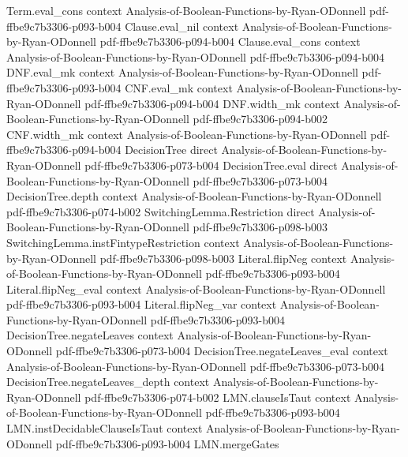 \begin{lemma}
\proofstep
  {Term.eval_cons}
  {context}
  {Analysis-of-Boolean-Functions-by-Ryan-ODonnell}
  {pdf-ffbe9c7b3306-p093-b004}
\proofstep
  {Clause.eval_nil}
  {context}
  {Analysis-of-Boolean-Functions-by-Ryan-ODonnell}
  {pdf-ffbe9c7b3306-p094-b004}
\proofstep
  {Clause.eval_cons}
  {context}
  {Analysis-of-Boolean-Functions-by-Ryan-ODonnell}
  {pdf-ffbe9c7b3306-p094-b004}
\proofstep
  {DNF.eval_mk}
  {context}
  {Analysis-of-Boolean-Functions-by-Ryan-ODonnell}
  {pdf-ffbe9c7b3306-p093-b004}
\proofstep
  {CNF.eval_mk}
  {context}
  {Analysis-of-Boolean-Functions-by-Ryan-ODonnell}
  {pdf-ffbe9c7b3306-p094-b004}
\proofstep
  {DNF.width_mk}
  {context}
  {Analysis-of-Boolean-Functions-by-Ryan-ODonnell}
  {pdf-ffbe9c7b3306-p094-b002}
\proofstep
  {CNF.width_mk}
  {context}
  {Analysis-of-Boolean-Functions-by-Ryan-ODonnell}
  {pdf-ffbe9c7b3306-p094-b004}
\proofstep
  {DecisionTree}
  {direct}
  {Analysis-of-Boolean-Functions-by-Ryan-ODonnell}
  {pdf-ffbe9c7b3306-p073-b004}
\proofstep
  {DecisionTree.eval}
  {direct}
  {Analysis-of-Boolean-Functions-by-Ryan-ODonnell}
  {pdf-ffbe9c7b3306-p073-b004}
\proofstep
  {DecisionTree.depth}
  {context}
  {Analysis-of-Boolean-Functions-by-Ryan-ODonnell}
  {pdf-ffbe9c7b3306-p074-b002}
\proofstep
  {SwitchingLemma.Restriction}
  {direct}
  {Analysis-of-Boolean-Functions-by-Ryan-ODonnell}
  {pdf-ffbe9c7b3306-p098-b003}
\proofstep
  {SwitchingLemma.instFintypeRestriction}
  {context}
  {Analysis-of-Boolean-Functions-by-Ryan-ODonnell}
  {pdf-ffbe9c7b3306-p098-b003}
\proofstep
  {Literal.flipNeg}
  {context}
  {Analysis-of-Boolean-Functions-by-Ryan-ODonnell}
  {pdf-ffbe9c7b3306-p093-b004}
\proofstep
  {Literal.flipNeg_eval}
  {context}
  {Analysis-of-Boolean-Functions-by-Ryan-ODonnell}
  {pdf-ffbe9c7b3306-p093-b004}
\proofstep
  {Literal.flipNeg_var}
  {context}
  {Analysis-of-Boolean-Functions-by-Ryan-ODonnell}
  {pdf-ffbe9c7b3306-p093-b004}
\proofstep
  {DecisionTree.negateLeaves}
  {context}
  {Analysis-of-Boolean-Functions-by-Ryan-ODonnell}
  {pdf-ffbe9c7b3306-p073-b004}
\proofstep
  {DecisionTree.negateLeaves_eval}
  {context}
  {Analysis-of-Boolean-Functions-by-Ryan-ODonnell}
  {pdf-ffbe9c7b3306-p073-b004}
\proofstep
  {DecisionTree.negateLeaves_depth}
  {context}
  {Analysis-of-Boolean-Functions-by-Ryan-ODonnell}
  {pdf-ffbe9c7b3306-p074-b002}
\proofstep
  {LMN.clauseIsTaut}
  {context}
  {Analysis-of-Boolean-Functions-by-Ryan-ODonnell}
  {pdf-ffbe9c7b3306-p093-b004}
\proofstep
  {LMN.instDecidableClauseIsTaut}
  {context}
  {Analysis-of-Boolean-Functions-by-Ryan-ODonnell}
  {pdf-ffbe9c7b3306-p093-b004}
\proofstep
  {LMN.mergeGates}

\end{lemma}
